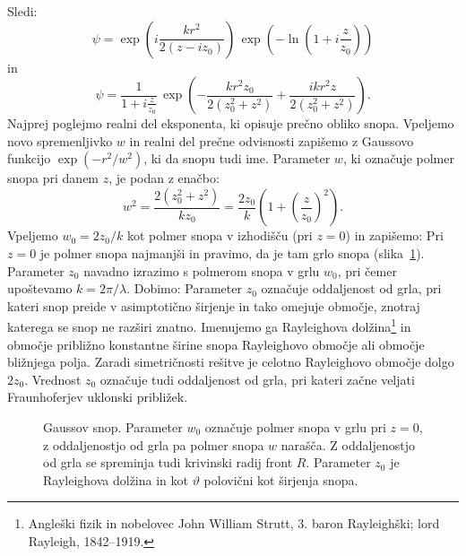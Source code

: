 Sledi:
\begin{equation}
\psi = \exp\left(i\frac{kr^{2}}{2(z-iz_0)}\right)\,\exp\left(-\ln(1+i\frac{z}{z_{0}})\right)
\end{equation}
in
\begin{equation}
 \psi = \frac{1}{1+i\frac{z}{z_{0}}}\,\exp\left(-\frac{kr^{2}z_{0}}{2(z_{0}^{2}+z^{2})}+
 \frac{ikr^{2}z}{2(z_{0}^{2}+z^{2})}\right)\!\!.
 \label{eq:gaussov-snop-vmesni}
\end{equation}
Najprej poglejmo realni del eksponenta, ki opisuje prečno obliko snopa. Vpeljemo novo spremenljivko $w$
in realni del prečne odvisnosti zapišemo z Gaussovo funkcijo $\exp(-r^2/w^2)$, 
ki da snopu tudi ime. Parameter $w$, ki označuje 
polmer snopa pri danem $z$, je podan z enačbo:
\begin{equation}
w^2 = \frac{2(z_0^2+z^2)}{kz_0}= \frac{2z_0}{k}\left(1+\left(\frac{z}{z_0}\right)^2\right)\!\!.
\end{equation}
Vpeljemo $w_0 = 2z_0/k$ kot polmer snopa v izhodišču (pri $z=0$) in zapišemo:
Pri $z=0$ je polmer snopa najmanjši in pravimo, da je tam grlo 
snopa 
(slika~\ref{fig:Gauss}).
Parameter $z_0$ 
navadno izrazimo s polmerom snopa v grlu $w_0$, pri čemer upoštevamo $k=2 \pi/\lambda$. Dobimo:
Parameter $z_{0}$ označuje oddaljenost od grla, 
pri kateri snop preide v asimptotično širjenje in tako omejuje območje,
znotraj katerega se snop ne razširi znatno. Imenujemo ga 
Rayleighova dolžina\footnote{Angleški fizik in 
nobelovec John William Strutt, 3. baron Rayleighški; lord Rayleigh, 1842--1919.}
in območje približno konstantne širine snopa Rayleighovo
območje ali območje bližnjega 
polja. Zaradi simetričnosti rešitve
je celotno Rayleighovo območje dolgo $2z_0$. 
Vrednost $z_{0}$ označuje tudi oddaljenost od grla, pri kateri začne veljati 
Fraunhoferjev uklonski približek.

\begin{figure}[ht]
\centering
\def\svgwidth{120truemm} 

\caption{Gaussov snop. Parameter $w_0$ označuje polmer snopa v grlu pri $z=0$, z oddaljenostjo
od grla pa polmer snopa $w$ narašča. Z oddaljenostjo od grla se spreminja tudi krivinski radij front $R$.
Parameter $z_0$ je Rayleighova dolžina in kot $\vartheta$ polovični kot širjenja snopa.}
\label{fig:Gauss}
\end{figure}

